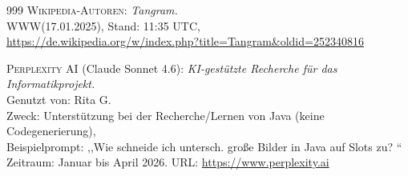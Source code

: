 %

\begin{thebibliography}{999}
     \textsc{Wikipedia-Autoren}: \textit{Tangram.}\\
			{\small WWW(17.01.2025), Stand: 11:35 UTC,}\\
			\url{https://de.wikipedia.org/w/index.php?title=Tangram&oldid=252340816}

     \textsc{Perplexity AI} (Claude Sonnet 4.6):
              \textit{KI-gestützte Recherche für das Informatikprojekt.}\\
              {\small Genutzt von: Rita G.}\\
              {\small Zweck: Unterstützung bei der Recherche/Lernen von Java (keine Codegenerierung),}\\
              {\small Beispielprompt: ,,Wie schneide ich untersch. große Bilder in Java auf Slots zu? ``}\\
              {\small Zeitraum: Januar bis April 2026. URL: \url{https://www.perplexity.ai}}
\end{thebibliography}
